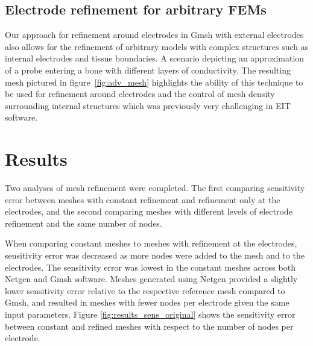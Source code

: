 \documentclass[12pt]{iopart}
\begin{document}

\subsection{Electrode refinement for arbitrary FEMs}
Our approach for refinement around electrodes in Gmsh with external electrodes 
also allows for the refinement of arbitrary models with complex structures
such as internal electrodes and tissue boundaries.
A scenario depicting an approximation of 
a probe entering a bone with different 
layers of conductivity. The resulting mesh pictured in 
figure~\ref{fig:adv_mesh}
highlights the ability of this technique
to be used for refinement around electrodes and the control of mesh density  
surrounding internal structures which was previously
very challenging in EIT software.

\section{Results}

Two analyses of mesh refinement were completed. The first comparing sensitivity error between
meshes with constant refinement and refinement only at the electrodes, and the second 
comparing meshes with different levels of electrode refinement and the same number of nodes.

When comparing constant meshes to meshes with refinement at the electrodes, sensitivity error
was decreased as more nodes were added to the mesh and to the electrodes. The sensitivity
error was lowest in the constant meshes across both Netgen and Gmsh software. Meshes 
generated using Netgen
provided a slightly lower sensitivity error relative to the respective reference mesh
compared to Gmsh, and resulted in meshes with fewer nodes per electrode given the same input
parameters. Figure \ref{fig:results_sens_original} shows the sensitivity error between
constant and refined meshes with respect to the number of nodes per electrode.  
\end{document}
